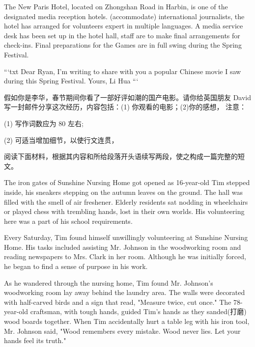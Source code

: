 \documentclass{英语试卷}
\begin{document}
\par The New Paris Hotel, located on Zhongshan Road in Harbin, is one of the designated media reception hotels.  (accommodate) international journalists, the hotel has arranged for volunteers expert in multiple languages. A media service desk has been set up in the hotel hall,  staff are to make final arrangements for check-ins. Final preparations for the Games are in full swing during the Spring Festival.\par
\par ```txt Dear Ryan, I'm writing to share with you a popular Chinese movie I saw during this Spring Festival. \blanknum{} Yours, Li Hua ```\par
{}
\par 假如你是李华，春节期间你看了一部好评如潮的国产电影。请你给英国朋友 David 写一封邮件分享这次经历，内容包括：(1) 你观看的电影；(2)你的感想， 注意：\par
\par (1) 写作词数应为 80 左右;\par
\par (2) 可适当增加细节，以使行文连贯，\par
{}
\par 阅读下面材料，根据其内容和所给段落开头语续写两段，使之构成一篇完整的短文。\par
\par The iron gates of Sunshine Nursing Home got opened as 16-year-old Tim stepped inside, his sneakers stepping on the autumn leaves on the ground. The hall was filled with the smell of air freshener. Elderly residents sat nodding in wheelchairs or played chess with trembling hands, lost in their own worlds. His volunteering here was a part of his school requirements.\par
\par Every Saturday, Tim found himself unwillingly volunteering at Sunshine Nursing Home. His tasks included assisting Mr. Johnson in the woodworking room and reading newspapers to Mrs. Clark in her room. Although he was initially forced, he began to find a sense of purpose in his work.\par
\par As he wandered through the nursing home, Tim found Mr. Johnson's woodworking room lay away behind the laundry area. The walls were decorated with half-carved birds and a sign that read, "Measure twice, cut once." The 78-year-old craftsman, with tough hands, guided Tim's hands as they sanded(打磨) wood boards together. When Tim accidentally hurt a table leg with his iron tool, Mr. Johnson said, "Wood remembers every mistake. Wood never lies. Let your hands feel its truth."\par
\end{document}
